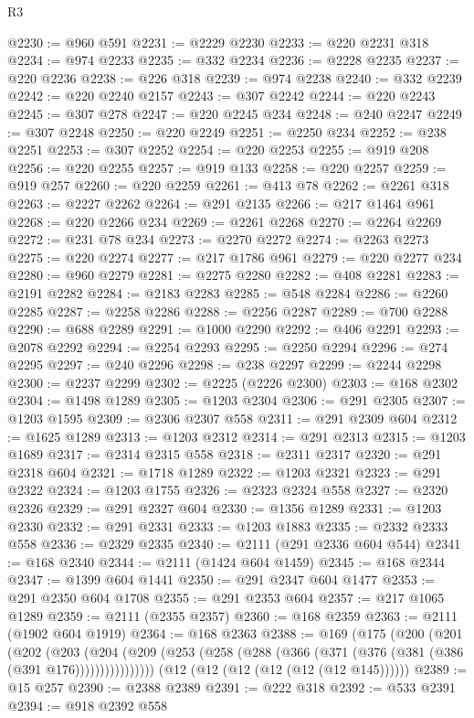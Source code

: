 \begin{lexlean}{R3}
\begin{coremodule}
@2230 := @960 @591
@2231 := @2229 @2230
@2233 := @220 @2231 @318
@2234 := @974 @2233
@2235 := @332 @2234
@2236 := @2228 @2235
@2237 := @220 @2236
@2238 := @226 @318
@2239 := @974 @2238
@2240 := @332 @2239
@2242 := @220 @2240 @2157
@2243 := @307 @2242
@2244 := @220 @2243
@2245 := @307 @278
@2247 := @220 @2245 @234
@2248 := @240 @2247
@2249 := @307 @2248
@2250 := @220 @2249
@2251 := @2250 @234
@2252 := @238 @2251
@2253 := @307 @2252
@2254 := @220 @2253
@2255 := @919 @208
@2256 := @220 @2255
@2257 := @919 @133
@2258 := @220 @2257
@2259 := @919 @257
@2260 := @220 @2259
@2261 := @413 @78
@2262 := @2261 @318
@2263 := @2227 @2262
@2264 := @291 @2135
@2266 := @217 @1464 @961
@2268 := @220 @2266 @234
@2269 := @2261 @2268
@2270 := @2264 @2269
@2272 := @231 @78 @234
@2273 := @2270 @2272
@2274 := @2263 @2273
@2275 := @220 @2274
@2277 := @217 @1786 @961
@2279 := @220 @2277 @234
@2280 := @960 @2279
@2281 := @2275 @2280
@2282 := @408 @2281
@2283 := @2191 @2282
@2284 := @2183 @2283
@2285 := @548 @2284
@2286 := @2260 @2285
@2287 := @2258 @2286
@2288 := @2256 @2287
@2289 := @700 @2288
@2290 := @688 @2289
@2291 := @1000 @2290
@2292 := @406 @2291
@2293 := @2078 @2292
@2294 := @2254 @2293
@2295 := @2250 @2294
@2296 := @274 @2295
@2297 := @240 @2296
@2298 := @238 @2297
@2299 := @2244 @2298
@2300 := @2237 @2299
@2302 := @2225 (@2226 @2300)
@2303 := @168 @2302
@2304 := @1498 @1289
@2305 := @1203 @2304
@2306 := @291 @2305
@2307 := @1203 @1595
@2309 := @2306 @2307 @558
@2311 := @291 @2309 @604
@2312 := @1625 @1289
@2313 := @1203 @2312
@2314 := @291 @2313
@2315 := @1203 @1689
@2317 := @2314 @2315 @558
@2318 := @2311 @2317
@2320 := @291 @2318 @604
@2321 := @1718 @1289
@2322 := @1203 @2321
@2323 := @291 @2322
@2324 := @1203 @1755
@2326 := @2323 @2324 @558
@2327 := @2320 @2326
@2329 := @291 @2327 @604
@2330 := @1356 @1289
@2331 := @1203 @2330
@2332 := @291 @2331
@2333 := @1203 @1883
@2335 := @2332 @2333 @558
@2336 := @2329 @2335
@2340 := @2111 (@291 @2336 @604 @544)
@2341 := @168 @2340
@2344 := @2111 (@1424 @604 @1459)
@2345 := @168 @2344
@2347 := @1399 @604 @1441
@2350 := @291 @2347 @604 @1477
@2353 := @291 @2350 @604 @1708
@2355 := @291 @2353 @604
@2357 := @217 @1065 @1289
@2359 := @2111 (@2355 @2357)
@2360 := @168 @2359
@2363 := @2111 (@1902 @604 @1919)
@2364 := @168 @2363
@2388 := @169
    (@175
      (@200
        (@201
          (@202
            (@203
              (@204 (@209 (@253 (@258 (@288 (@366 (@371 (@376 (@381 (@386 (@391 @176))))))))))))))))
    (@12 (@12 (@12 (@12 (@12 (@12 @145))))))
@2389 := @15 @257
@2390 := @2388 @2389
@2391 := @222 @318
@2392 := @533 @2391
@2394 := @918 @2392 @558

\end{coremodule}
\end{lexlean}
